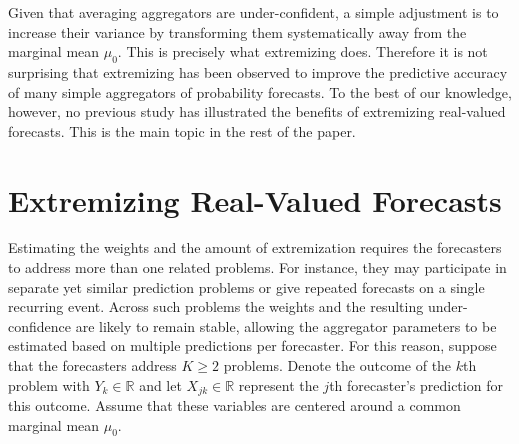 \documentclass[11pt]{article}
\theoremstyle{definition}
\theoremstyle{definition}
\begin{document}


Given that averaging aggregators are under-confident, a simple adjustment is to  increase their variance by transforming them systematically away from the marginal mean $\mu_0$. This is precisely what extremizing does. Therefore it is not surprising that extremizing has been observed to improve the predictive accuracy of many simple aggregators of  probability forecasts. To the best of our knowledge, however,  no previous study has illustrated the benefits of extremizing real-valued forecasts. This is the main topic in the rest of the paper.



\section{Extremizing Real-Valued Forecasts} \label{extremization}

Estimating the weights and the amount of extremization requires the forecasters to address more than one related problems. For instance, they may participate in separate yet similar prediction problems or give repeated forecasts on a single recurring event. Across such problems the weights and the resulting under-confidence are likely to remain stable, allowing the aggregator parameters to be estimated based on multiple predictions per forecaster. For this reason, suppose that the forecasters address $K \geq 2$ problems. Denote the outcome of the $k$th problem with $Y_k \in \mathbb{R}$ and let $X_{jk} \in \mathbb{R}$ represent the $j$th forecaster's prediction for this outcome. Assume that these variables are centered around a common marginal mean $\mu_0$.  
\end{document}
